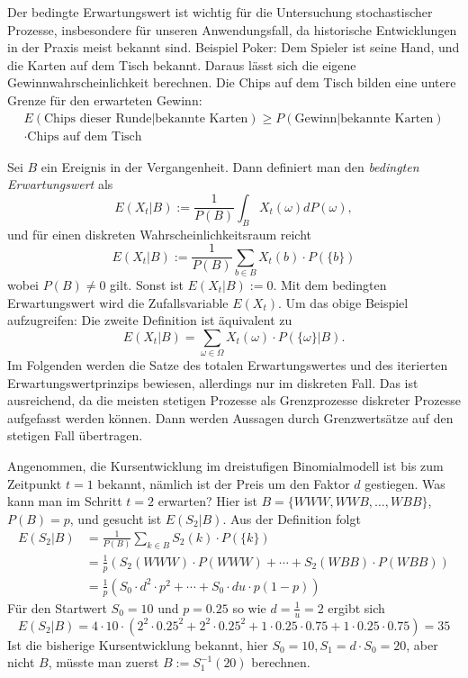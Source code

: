 \begin{defi}

Der bedingte Erwartungswert ist wichtig für die Untersuchung stochastischer Prozesse,
insbesondere für unseren Anwendungsfall, da historische Entwicklungen in der Praxis 
meist bekannt sind. Beispiel Poker: Dem Spieler ist seine Hand, und die Karten auf dem 
Tisch bekannt. Daraus lässt sich die eigene Gewinnwahrscheinlichkeit berechnen. Die Chips auf
dem Tisch bilden eine untere Grenze für den erwarteten Gewinn:
$$
\begin{aligned}
E(\text{Chips dieser Runde}|\text{bekannte Karten}) \ge P(\text{Gewinn}|\text{bekannte Karten}) 
\\ \cdot \text{Chips auf dem Tisch}
\end{aligned}
$$

Sei $B$ ein Ereignis in der Vergangenheit. Dann definiert man
den \textit{bedingten Erwartungswert} als $$E(X_t|B):=  \frac{1}{P(B)} \int_{B}^{} X_t(\omega) dP(\omega),$$
und für einen diskreten Wahrscheinlichkeitsraum reicht
$$E(X_t|B):= \frac{1}{P(B)}\sum_{b \in B} X_t(b) \cdot P(\{ b \})$$
wobei $P(B) \neq 0$ gilt. Sonst ist $E(X_t|B) :=0$. 
Mit dem bedingten Erwartungswert wird die Zufallsvariable $E(X_t)$.
Um das obige Beispiel aufzugreifen: Die zweite Definition ist äquivalent zu
$$
E(X_t|B) = \sum_{\omega \in \Omega} X_t(\omega) \cdot P(\{\omega\}|B).
$$
Im Folgenden werden die Satze des totalen Erwartungswertes und des iterierten Erwartungswertprinzips bewiesen,
allerdings nur im diskreten Fall. Das ist ausreichend, da die meisten stetigen 
Prozesse als Grenzprozesse diskreter Prozesse aufgefasst werden können.
Dann werden Aussagen durch Grenzwertsätze auf den stetigen Fall übertragen. 

\end{defi}

\begin{bsp}[Rechenbeispiel]
Angenommen, die Kursentwicklung im dreistufigen Binomialmodell ist bis zum 
Zeitpunkt $t=1$ bekannt, nämlich ist der Preis um den Faktor $d$ gestiegen. 
Was kann man im Schritt $t=2$ erwarten? Hier ist $B=\{WWW, WWB, \dots, WBB \}$, $P(B)=p$, und gesucht ist $E(S_2|B)$. Aus der Definition folgt
$$
\begin{aligned}
E(S_2|B) &= \frac{1}{P(B)}\sum_{k \in B} S_2(k) \cdot P(\{ k \}) \\ &=\frac{1}{p}(S_2(WWW) \cdot P(WWW)+ \cdots + S_2(WBB) \cdot P(WBB)) \\
&= \frac{1}{p} (S_0 \cdot d^2 \cdot  p^2 + \cdots + S_0 \cdot d u \cdot p (1-p))
\end{aligned}
$$
Für den Startwert $S_0=10$ und $p=0.25$ so wie $d=\frac{1}{u}=2$ ergibt sich
$$E(S_2|B)=4 \cdot 10 \cdot \left( 2^2 \cdot 0.25^2 + 2^2 \cdot 0.25^2 + 1 \cdot 0.25\cdot 0.75 + 1 \cdot 0.25\cdot 0.75 \right)=35$$
Ist die bisherige Kursentwicklung bekannt, hier $S_0=10, S_1 = d \cdot S_0=20$, aber nicht $B$, müsste man zuerst $B:=S_1^{-1}(20)$ berechnen.
\end{bsp}


